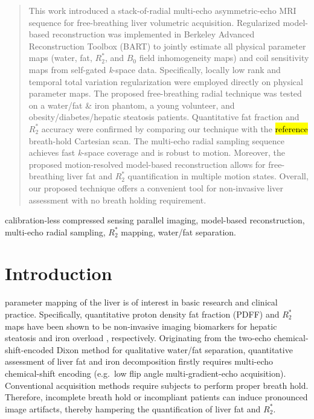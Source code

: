\documentclass[journal,twoside,web]{ieeecolor}
\begin{document}
\begin{abstract}

This work introduced a stack-of-radial multi-echo asymmetric-echo MRI sequence 
for free-breathing liver volumetric acquisition. 
Regularized model-based reconstruction was implemented 
in Berkeley Advanced Reconstruction Toolbox (BART) 
to jointly estimate all physical parameter maps 
(water, fat, $R_2^*$, and $B_0$ field inhomogeneity maps) 
and coil sensitivity maps from self-gated \textit{k}-space data. 
Specifically, locally low rank and temporal total variation regularization 
were employed directly on physical parameter maps. 
The proposed free-breathing radial technique 
was tested on a water/fat \& iron phantom, a young volunteer, 
and obesity/diabetes/hepatic steatosis patients. 
Quantitative fat fraction and $R_2^*$ accuracy were confirmed 
by comparing our technique with the \hl{reference} breath-hold Cartesian scan.
The multi-echo radial sampling sequence achieves 
fast \textit{k}-space coverage and is robust to motion. 
Moreover, the proposed motion-resolved model-based reconstruction 
allows for free-breathing liver fat and $R_2^*$ quantification 
in multiple motion states. 
Overall, our proposed technique offers a convenient tool 
for non-invasive liver assessment with no breath holding requirement.

\end{abstract}

\begin{IEEEkeywords}
calibration-less compressed sensing parallel imaging, model-based reconstruction, multi-echo radial sampling, $R_2^*$ mapping, water/fat separation.
\end{IEEEkeywords}

\section{Introduction}
\label{sec:introduction}

 parameter mapping of the liver is of interest 
in basic research and clinical practice. Specifically, quantitative 
proton density fat fraction (PDFF) and $R_2^*$ maps have been shown 
to be non-invasive imaging biomarkers for hepatic 
steatosis \cite{caussy_2018_fat,hu_2020_obesity} and 
iron overload \cite{wood_2011_iron,hernando_2014_iron}, respectively. 
Originating from the two-echo chemical-shift-encoded Dixon method 
\cite{dixon_1984_wf} for qualitative water/fat separation, 
quantitative assessment of liver fat and iron decomposition firstly requires 
multi-echo chemical-shift encoding (e.g.~low flip angle multi-gradient-echo acquisition). 
Conventional acquisition methods require subjects to perform proper breath hold. 
Therefore, incomplete breath hold or incompliant patients can induce 
pronounced image artifacts, 
thereby hampering the quantification of liver fat and $R_2^*$.
\end{document}
